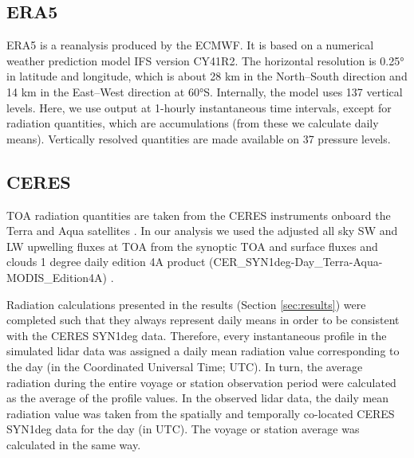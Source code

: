 \documentclass[12pt,a4paper]{article}
\begin{document}
\subsection{ERA5}

ERA5 \citep{era5} is a reanalysis produced by the ECMWF.  It is based on a
numerical weather prediction model IFS version CY41R2.  The horizontal
resolution is 0.25° in latitude and longitude, which is about 28 km in the
North--South direction and 14 km in the East--West direction at 60°S.
Internally, the model uses 137 vertical levels. Here, we use output at 1-hourly
instantaneous time intervals, except for radiation quantities, which are
accumulations (from these we calculate daily means).  Vertically resolved
quantities are made available on 37 pressure levels.

\subsection{CERES}

TOA radiation quantities are taken from the CERES instruments onboard the
Terra and Aqua satellites \citep{wielicki1996,loeb2018}. In our analysis we
used the adjusted all sky SW and LW upwelling fluxes at TOA from the synoptic
TOA and surface fluxes and clouds 1 degree daily edition 4A product
(CER\_SYN1deg-Day\_Terra-Aqua-MODIS\_Edition4A)
\citep{doelling2013,doelling2016}.

Radiation calculations presented in the results (Section \ref{sec:results})
were completed such that they always represent daily means in order to be consistent with the CERES SYN1deg data. Therefore, every instantaneous profile in the
simulated lidar data was assigned a daily mean radiation value corresponding to
the day (in the Coordinated Universal Time; UTC). In turn, the average
radiation during the entire voyage or station observation period were
calculated as the average of the profile values. In the observed lidar data,
the daily mean radiation value was taken from the spatially and temporally
co-located CERES SYN1deg data for the day (in UTC). The voyage or station
average was calculated in the same way.
\end{document}

